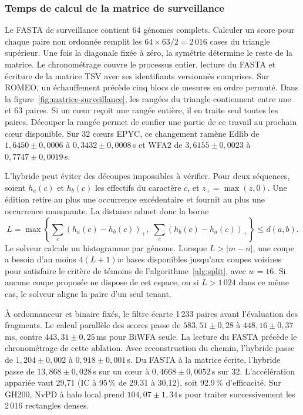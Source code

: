 \subsubsection{Temps de calcul de la matrice de surveillance}\label{sec:matrice-surveillance}
Le FASTA de surveillance contient 64 génomes complets. Calculer un score pour chaque paire non ordonnée remplit les \(64\times63/2=2\,016\) cases du triangle supérieur. Une fois la diagonale fixée à zéro, la symétrie détermine le reste de la matrice. Le chronométrage couvre le processus entier, lecture du FASTA et écriture de la matrice TSV avec ses identifiants versionnés comprises. Sur ROMEO, un échauffement précède cinq blocs de mesures en ordre permuté.
Dans la figure~\ref{fig:matrice-surveillance}, les rangées du triangle contiennent entre une et 63 paires. Si un cœur reçoit une rangée entière, il en traite seul toutes les paires. Découper la rangée permet de confier une partie de ce travail au prochain cœur disponible. Sur 32 cœurs EPYC, ce changement ramène Edlib de \(1{,}6450\pm0{,}0006\) à \(0{,}3432\pm0{,}0008\)\,s et WFA2 de \(3{,}6155\pm0{,}0023\) à \(0{,}7747\pm0{,}0019\)\,s.

L'hybride peut éviter des découpes impossibles à vérifier. Pour deux séquences, soient \(h_a(c)\) et \(h_b(c)\) les effectifs du caractère \(c\), et \(z_+=\max(z,0)\). Une édition retire au plus une occurrence excédentaire et fournit au plus une occurrence manquante. La distance admet donc la borne
\[
 L=\max\!\left\{\sum_c(h_a(c)-h_b(c))_+,\;\sum_c(h_b(c)-h_a(c))_+\right\}\le d(a,b).
\]
Le solveur calcule un histogramme par génome. Lorsque \(L>|m-n|\), une coupe a besoin d'au moins \(4(L+1)w\) bases disponibles jusqu'aux coupes voisines pour satisfaire le critère de témoins de l'algorithme~\ref{alg:split}, avec \(w=16\). Si aucune coupe proposée ne dispose de cet espace, ou si \(L>1\,024\) dans ce même cas, le solveur aligne la paire d'un seul tenant.

À ordonnanceur et binaire fixés, le filtre écarte 1\,233 paires avant l'évaluation des fragments. Le calcul parallèle des scores passe de \(583{,}51\pm0{,}28\) à \(448{,}16\pm0{,}37\)\,ms, contre \(443{,}31\pm0{,}25\)\,ms pour BiWFA seule. La lecture du FASTA précède le chronométrage de cette ablation. Avec reconstruction du chemin, l'hybride passe de \(1{,}204\pm0{,}002\) à \(0{,}918\pm0{,}001\)\,s.
Du FASTA à la matrice écrite, l’hybride passe de \(13{,}868\pm0{,}028\)\,s sur un cœur à \(0{,}4668\pm0{,}0052\)\,s sur 32. L’accélération appariée vaut 29,71 (IC à 95\,\% de 29,31 à 30,12), soit 92,9\,\% d’efficacité. Sur GH200, NvPD à halo local prend \(104{,}07\pm1{,}34\)\,s pour traiter successivement les 2\,016 rectangles denses.
